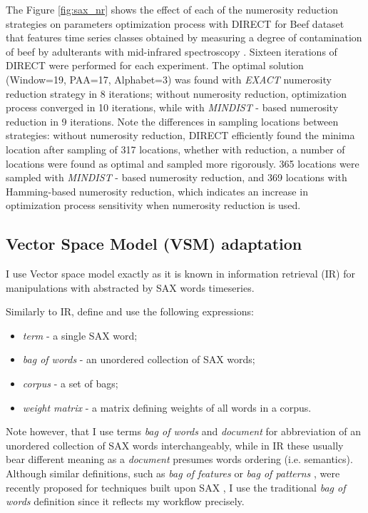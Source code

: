 The Figure \ref{fig:sax_nr} shows the effect of each of the numerosity reduction strategies on parameters optimization
process with DIRECT for Beef dataset that features time series classes obtained by measuring a degree of contamination 
of beef by adulterants with mid-infrared spectroscopy \cite{citeulike:12859637}. 
Sixteen iterations of DIRECT were performed for each experiment. 
The optimal solution (Window=19, PAA=17, Alphabet=3) was found with \textit{EXACT} numerosity reduction strategy 
in 8 iterations; without numerosity reduction, optimization process converged in 10 iterations, while 
with \textit{MINDIST} - based numerosity reduction in 9 iterations. 
Note the differences in sampling locations between strategies: without numerosity reduction, DIRECT efficiently found 
the minima location after sampling of 317 locations, whether with reduction, a number of locations were found as optimal 
and sampled more rigorously. 
365 locations were sampled with \textit{MINDIST} - based numerosity reduction, and 369 locations with Hamming-based 
numerosity reduction, which indicates an increase in optimization process sensitivity when numerosity reduction is used.



\subsection{Vector Space Model (VSM) adaptation}\label{vsm}
I use Vector space model exactly as it is known in information retrieval (IR) \cite{citeulike:300428} for 
manipulations with abstracted by SAX words timeseries. 

Similarly to IR, define and use the following expressions:
\begin{itemize}
  \item \textit{term} - a single SAX word;
  \item \textit{bag of words} - an unordered collection of SAX words;
  \item \textit{corpus} - a set of bags;
  \item \textit{weight matrix} - a matrix defining weights of all words in a corpus.
\end{itemize}
Note however, that I use terms \textit{bag of words} and \textit{document} for abbreviation of an unordered 
collection of SAX words interchangeably, while in IR these usually bear different meaning as a \textit{document} 
presumes words ordering (i.e. semantics). 
Although similar definitions, such as \textit{bag of features} \cite{citeulike:12636726} 
or \textit{bag of patterns} \cite{citeulike:10525778}, were recently proposed for techniques built 
upon SAX \cite{citeulike:10525778}, I use the traditional \textit{bag of words} definition since it reflects 
my workflow precisely. 

